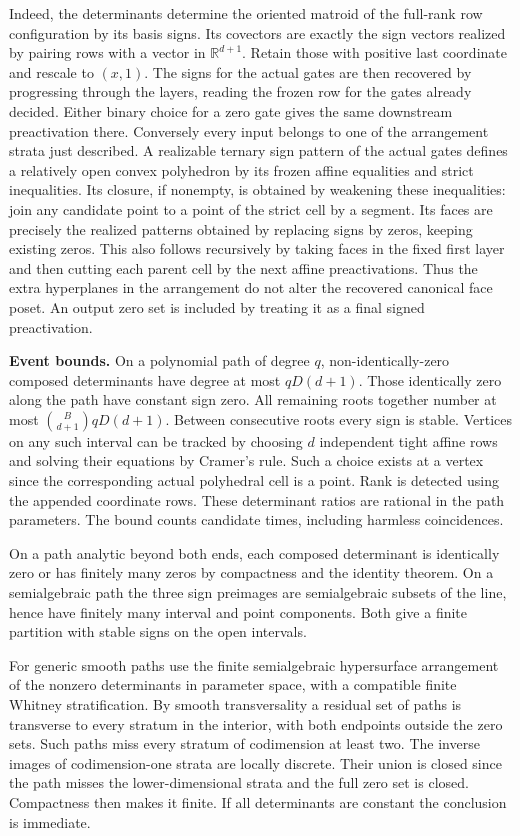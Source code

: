 \documentclass[10pt]{article}
\begin{document}
Indeed, the determinants determine the oriented matroid of the full-rank row configuration by its basis signs. Its covectors are exactly the sign vectors realized by pairing rows with a vector in $\mathbb R^{d+1}$. Retain those with positive last coordinate and rescale to $(x,1)$. The signs for the actual gates are then recovered by progressing through the layers, reading the frozen row for the gates already decided. Either binary choice for a zero gate gives the same downstream preactivation there. Conversely every input belongs to one of the arrangement strata just described. A realizable ternary sign pattern of the actual gates defines a relatively open convex polyhedron by its frozen affine equalities and strict inequalities. Its closure, if nonempty, is obtained by weakening these inequalities: join any candidate point to a point of the strict cell by a segment. Its faces are precisely the realized patterns obtained by replacing signs by zeros, keeping existing zeros. This also follows recursively by taking faces in the fixed first layer and then cutting each parent cell by the next affine preactivations. Thus the extra hyperplanes in the arrangement do not alter the recovered canonical face poset. An output zero set is included by treating it as a final signed preactivation.

\textbf{Event bounds.} On a polynomial path of degree $q$, non-identically-zero composed determinants have degree at most $qD(d+1)$. Those identically zero along the path have constant sign zero. All remaining roots together number at most $\binom{B}{d+1}qD(d+1)$. Between consecutive roots every sign is stable. Vertices on any such interval can be tracked by choosing $d$ independent tight affine rows and solving their equations by Cramer's rule. Such a choice exists at a vertex since the corresponding actual polyhedral cell is a point. Rank is detected using the appended coordinate rows. These determinant ratios are rational in the path parameters. The bound counts candidate times, including harmless coincidences.

On a path analytic beyond both ends, each composed determinant is identically zero or has finitely many zeros by compactness and the identity theorem. On a semialgebraic path the three sign preimages are semialgebraic subsets of the line, hence have finitely many interval and point components. Both give a finite partition with stable signs on the open intervals.

For generic smooth paths use the finite semialgebraic hypersurface arrangement of the nonzero determinants in parameter space, with a compatible finite Whitney stratification. By smooth transversality a residual set of paths is transverse to every stratum in the interior, with both endpoints outside the zero sets. Such paths miss every stratum of codimension at least two. The inverse images of codimension-one strata are locally discrete. Their union is closed since the path misses the lower-dimensional strata and the full zero set is closed. Compactness then makes it finite. If all determinants are constant the conclusion is immediate.
\end{document}
